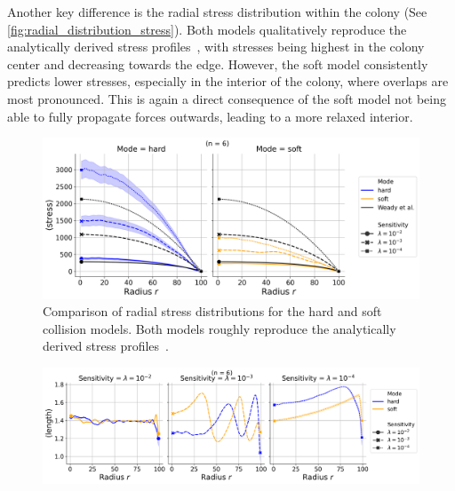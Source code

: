 \documentclass[conference]{IEEEtran}
\begin{document}
\newpage

Another key difference is the radial stress distribution within the colony (See \autoref{fig:radial_distribution_stress}). Both models qualitatively reproduce the analytically derived stress profiles~\cite{Weady2024}, with stresses being highest in the colony center and decreasing towards the edge. However, the soft model consistently predicts lower stresses, especially in the interior of the colony, where overlaps are most pronounced. This is again a direct consequence of the soft model not being able to fully propagate forces outwards, leading to a more relaxed interior.


\begin{figure}[h]
    \centering
    \includegraphics[width=\linewidth]{figures/comparison_plots/combined_stress_shared.png}
    \caption{Comparison of radial stress distributions for the hard and soft collision models. Both models roughly reproduce the analytically derived stress profiles~\cite{Weady2024}.}
    \label{fig:radial_distribution_stress}
\end{figure}


\begin{figure}[h]
    \centering
    \includegraphics[width=\linewidth]{figures/comparison_plots/combined_length_shared.png}

    \caption{ }
\end{figure}
\end{document}
